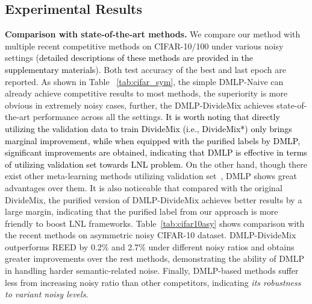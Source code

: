 \documentclass[10pt,twocolumn,letterpaper]{article}
\newcommand{\zbs}[1]{\textcolor{black}{#1}}
\begin{document}
\subsection{Experimental Results}
 \textbf{Comparison with state-of-the-art methods.} We compare our method with multiple recent competitive methods on CIFAR-10/100 under various noisy settings (\zbs{detailed descriptions of these methods are provided in the supplementary materials}). Both test accuracy of the best and last epoch are reported. As shown in Table ~\ref{tab:cifar_sym}, {the simple DMLP-Naive can already achieve competitive results to most methods, the superiority is more obvious in extremely noisy cases, further, the} DMLP-DivideMix achieves state-of-the-art performance across all the settings. \zbs{It is worth noting that directly utilizing the validation data to train DivideMix (i.e., DivideMix{*}) only brings marginal improvement, while when equipped with the purified labels by DMLP, significant improvements are obtained, indicating that DMLP is effective in terms of utilizing validation set towards LNL problem.}
{On the other hand}, though {there exist other} meta-learning methods {utilizing} validation set~\cite{MLNT,AAAI-2021-meta,zheng2021meta}, DMLP shows great advantages over them. {It is also noticeable that compared with the original DivideMix, the purified version of DMLP-DivideMix achieves better results by a large margin, indicating that the purified label from our approach is more friendly to boost LNL frameworks.} Table~\ref{tab:cifar10asy} shows comparison with the recent methods on asymmetric noisy CIFAR-10 dataset. DMLP-DivideMix outperforms REED by 0.2\% and 2.7\% {under different noisy ratios} and obtains greater improvements over the rest methods, {demonstrating} the ability of DMLP in handling harder {semantic-related} noise. Finally, DMLP-based methods suffer {less from increasing noisy ratio than other competitors,} indicating \emph{its robustness to variant noisy levels}.











        









        
\end{document}
